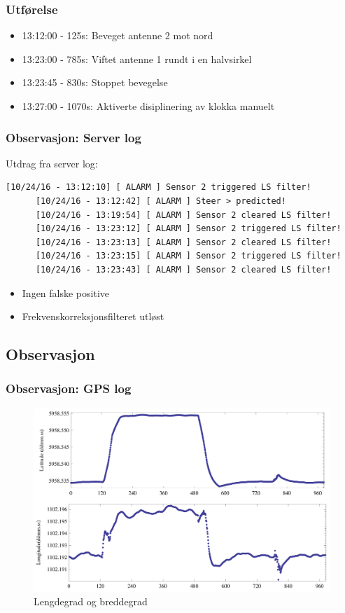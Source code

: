 \documentclass[xcolor=table]{beamer}
\begin{document}
\begin{frame}
\frametitle{Utførelse}
      \begin{itemize}
        \item 13:12:00 - 125s: Beveget antenne 2 mot nord
        \item 13:23:00 - 785s: Viftet antenne 1 rundt i en halvsirkel
        \item 13:23:45 - 830s: Stoppet bevegelse
        \item 13:27:00 - 1070s: Aktiverte disiplinering av klokka manuelt
      \end{itemize}
\end{frame}

\begin{frame}[fragile]
\frametitle{Observasjon: Server log}
Utdrag fra server log:
    \begin{lstlisting}[basicstyle=\ttfamily\tiny]
      [10/24/16 - 13:12:10] [ ALARM ] Sensor 2 triggered LS filter!
      [10/24/16 - 13:12:42] [ ALARM ] Steer > predicted!
      [10/24/16 - 13:19:54] [ ALARM ] Sensor 2 cleared LS filter!
      [10/24/16 - 13:23:12] [ ALARM ] Sensor 2 triggered LS filter!
      [10/24/16 - 13:23:13] [ ALARM ] Sensor 2 cleared LS filter!
      [10/24/16 - 13:23:15] [ ALARM ] Sensor 2 triggered LS filter!
      [10/24/16 - 13:23:43] [ ALARM ] Sensor 2 cleared LS filter!
    \end{lstlisting} 
\begin{itemize}
  \item Ingen falske positive
  \item Frekvenskorreksjonsfilteret utløst
\end{itemize}
\end{frame}

\begin{frame}
\subsection{Observasjon}
\frametitle{Observasjon: GPS log}
        \begin{figure}
        \includegraphics[scale=0.8]{thesis/graphics/20161024-test2-sensor2-multipanel-1-1.png}
        \caption{Lengdegrad og breddegrad}
      \end{figure}
\end{frame}
\end{document}
